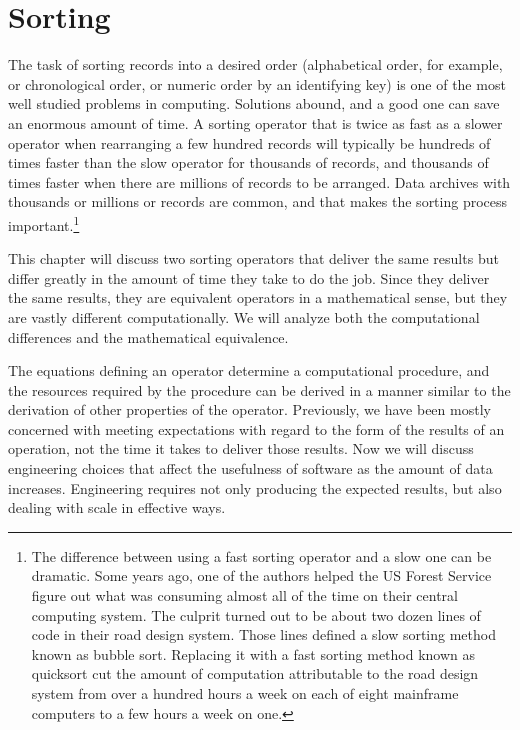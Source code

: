 \chapter{Sorting}
\label{ch:sorting}

The task of sorting records into a desired order
(alphabetical order, for example, or chronological order,
or numeric order by an identifying key)
is one of the most well studied problems in computing.
Solutions abound,
and a good one can save an enormous amount of time.
A sorting operator that is twice as fast
as a slower operator when rearranging a few hundred records
will typically be hundreds of times faster than the slow operator
for thousands of records, and thousands of times faster
when there are millions of records to be arranged.
Data archives with thousands or millions or records
are common, and that makes the sorting process important.\footnote{The
difference between using a fast sorting operator and a slow one
can be dramatic.
\label{bubble-vs-quicksort-example}
Some years ago, one of the authors helped the US Forest Service
figure out what was consuming almost all of the time
on their central computing system.
The culprit turned out to be about two dozen lines
of code in their road design system.
Those lines defined a slow sorting method
known as bubble sort. Replacing it with a fast sorting
method known as quicksort cut the amount of computation
attributable to the road design system from over a hundred
hours a week on each of eight mainframe computers to a few hours
a week on one.}

This chapter will discuss two sorting operators that
deliver the same results but differ
greatly in the amount of time they take to do the job.
Since they deliver the same results,
they are equivalent operators in a mathematical sense,
but they are vastly different computationally.
We will analyze both the computational differences
and the 
mathematical equivalence.

The equations defining an operator
determine a computational procedure, and the
resources required by the procedure can be derived
in a manner similar to the derivation of other properties
of the operator.
Previously, we have been mostly concerned with meeting
expectations with regard to the form of the results
of an operation, not the time it takes to deliver those results.
Now we will discuss engineering choices that affect the usefulness of
software as the amount of data increases.
Engineering requires not only producing the expected
results, but also dealing with scale in effective ways.

